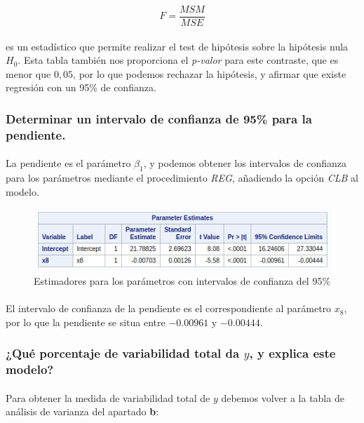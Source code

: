 \documentclass{article}
\begin{document}
  \begin{equation}
    F = \frac{MSM}{MSE}
  \end{equation}

  \paragraph{}
  es un estadístico que permite realizar el test de hipótesis sobre la hipótesis nula $H_0$. Esta tabla también nos proporciona el \textit{p-valor} para este contraste, que es menor que $0,05$, por lo que podemos rechazar la hipótesis, y afirmar que existe regresión con un 95\% de confianza.

  \subsubsection{Determinar un intervalo de confianza de 95\% para la pendiente.}

  \paragraph{}
  La pendiente es el parámetro $\beta_1$, y podemos obtener los intervalos de confianza para los parámetros mediante el procedimiento \textit{REG}, añadiendo la opción \textit{CLB} al modelo.

  \begin{figure}[H]
    \centering
    \includegraphics[width=.6\linewidth]{img/montgomery/icestim.png}
    \caption{Estimadores para los parámetros con intervalos de confianza del 95\%}
  \end{figure}

  \paragraph{}
  El intervalo de confianza de la pendiente es el correspondiente al parámetro $x_8$, por lo que la pendiente se situa entre $-0.00961$ y $-0.00444$.

  \subsubsection{¿Qué porcentaje de variabilidad total da $y$, y explica este modelo?}

  \paragraph{}
  Para obtener la medida de variabilidad total de $y$ debemos volver a la tabla de análisis de varianza del apartado \textbf{b}:
\end{document}
